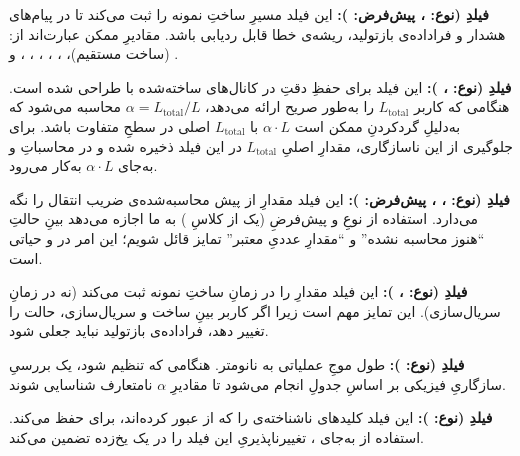 \textbf{فیلدِ  (نوع: ، پیش‌فرض: ):} این فیلد مسیرِ ساختِ نمونه را ثبت می‌کند تا در پیام‌های هشدار و فراداده‌ی بازتولید، ریشه‌ی خطا قابل ردیابی باشد. مقادیرِ ممکن عبارت‌اند از:  (ساخت مستقیم)، ، ، ، ، ،  و .

\textbf{فیلدِ  (نوع: ، ):} این فیلد برای حفظِ دقتِ  در کانال‌های ساخته‌شده با  طراحی شده است. هنگامی که کاربر $L_{\text{total}}$ را به‌طور صریح ارائه می‌دهد، $\alpha = L_{\text{total}} / L$ محاسبه می‌شود که به‌دلیلِ گردکردنِ  ممکن است $\alpha \cdot L$ با $L_{\text{total}}$ اصلی در سطحِ  متفاوت باشد. برای جلوگیری از این ناسازگاری، مقدارِ اصلیِ $L_{\text{total}}$ در این فیلد ذخیره شده و در محاسباتِ  و  به‌جای $\alpha \cdot L$ به‌کار می‌رود.

\textbf{فیلدِ  (نوع: ، ، پیش‌فرض: ):} این فیلد مقدارِ از پیش محاسبه‌شده‌ی ضریب انتقال را نگه می‌دارد. استفاده از نوعِ  و پیش‌فرضِ  (یک  از کلاسِ ) به ما اجازه می‌دهد بینِ حالتِ ``هنوز محاسبه نشده'' و ``مقدارِ عددیِ معتبر'' تمایز قائل شویم؛ این امر در  و  حیاتی است.

\textbf{فیلدِ  (نوع: ، ):} این فیلد مقدارِ  را در زمانِ ساختِ نمونه ثبت می‌کند (نه در زمانِ سریال‌سازی). این تمایز مهم است زیرا اگر کاربر بینِ ساخت و سریال‌سازی، حالت  را تغییر دهد، فراداده‌ی بازتولید نباید جعلی شود.

\textbf{فیلدِ  (نوع: ):} طول موجِ عملیاتی به نانومتر. هنگامی که تنظیم شود، یک بررسیِ سازگاریِ فیزیکی بر اساسِ جدولِ  انجام می‌شود تا مقادیرِ $\alpha$ نامتعارف شناسایی شوند.

\textbf{فیلدِ  (نوع: ):} این فیلد کلیدهای ناشناخته‌ی  را که از  عبور کرده‌اند، برای  حفظ می‌کند. استفاده از  به‌جای ، تغییرناپذیریِ این فیلد را در یک  یخ‌زده تضمین می‌کند.


